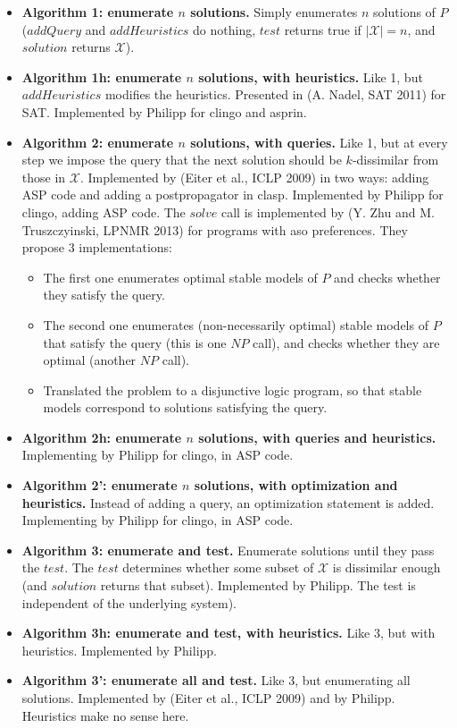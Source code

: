 \documentclass[a4paper,10pt]{article}
\begin{document}
\begin{itemize}
\item
\textbf{Algorithm 1: enumerate $n$ solutions.}
Simply enumerates $n$ solutions of $P$ 
($addQuery$ and $addHeuristics$ do nothing, 
$test$ returns true if $|\mathcal{X}|=n$, 
and $solution$ returns $\mathcal{X}$).
\item
\textbf{Algorithm 1h: enumerate $n$ solutions, with heuristics.}
Like 1, but $addHeuristics$ modifies the heuristics. 
Presented in (A. Nadel, SAT 2011) for SAT. 
Implemented by Philipp for clingo and asprin.
\item
\textbf{Algorithm 2: enumerate $n$ solutions, with queries.}
Like 1, but at every step we impose the query that the next solution should be $k$-dissimilar from those in $\mathcal{X}$.
Implemented by (Eiter et al., ICLP 2009) in two ways: adding ASP code and adding a postpropagator in clasp.
Implemented by Philipp for clingo, adding ASP code.
The $solve$ call is implemented by (Y. Zhu and M. Truszczyinski, LPNMR 2013) for programs with aso preferences.
They propose 3 implementations:
\begin{itemize}
    \item
    The first one enumerates optimal stable models of $P$ and checks whether they satisfy the query.
    \item
    The second one enumerates (non-necessarily optimal) stable models of $P$ that satisfy the query (this is one $NP$ call), 
    and checks whether they are optimal (another $NP$ call).
    \item
    Translated the problem to a disjunctive logic program, so that stable models correspond to solutions satisfying the query.
\end{itemize}
\item
\textbf{Algorithm 2h: enumerate $n$ solutions, with queries and heuristics.}
Implementing by Philipp for clingo, in ASP code.
\item
\textbf{Algorithm 2': enumerate $n$ solutions, with optimization and heuristics.}
Instead of adding a query, an optimization statement is added.
Implementing by Philipp for clingo, in ASP code.
\item
\textbf{Algorithm 3: enumerate and test.}
Enumerate solutions until they pass the $test$.
The $test$ determines whether some subset of $\mathcal{X}$ is dissimilar enough (and $solution$ returns that subset).
Implemented by Philipp. The test is independent of the underlying system).
\item
\textbf{Algorithm 3h: enumerate and test, with heuristics.}
Like 3, but with heuristics. Implemented by Philipp.
\item
\textbf{Algorithm 3': enumerate all and test.}
Like 3, but enumerating all solutions. 
Implemented by (Eiter et al., ICLP 2009) and by Philipp.
Heuristics make no sense here.
\end{itemize}
\end{document}
